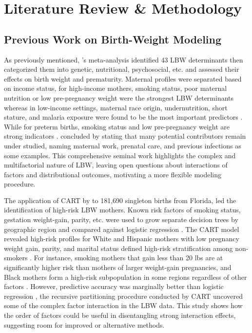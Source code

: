 \chapter{Literature Review \& Methodology}
\label{chap:chapter2-title}

\section{Previous Work on Birth-Weight Modeling}
\label{sec:ch2-previous-work}

As previously mentioned, \citet{kramer1987}'s meta-analysis identified 43 LBW determinants then categorized them into genetic, nutritional, psychosocial, etc. and assessed their effects on birth weight and prematurity. Maternal profiles were separated based on income status, for high-income mothers, smoking status, poor maternal nutrition or low pre-pregnancy weight were the strongest LBW determinants whereas in low-income settings, maternal race origin, undernutrition, short stature, and malaria exposure were found to be the most important predictors \citep{kramer1987}. While for preterm births, smoking status and low pre-pregnancy weight are strong indicators \citep{kramer1987}.  \citet{kramer1987} concluded by stating that many potential contributors remain under studied, naming maternal work, prenatal care, and previous infections as some examples. This comprehensive seminal work highlights the complex and multifactorial nature of LBW, leaving open questions about interactions of factors and distributional outcomes, motivating a more flexible modeling procedure.

The application of CART by \citet{KITSANTAS2006275} to 181,690 singleton births from Florida, led the identification of high-risk LBW mothers. Known risk factors of smoking status, gestation weight-gain, parity, etc. were used to grow separate decision trees by geographic region and compared against logistic regression \citep{KITSANTAS2006275}. The CART model revealed high-risk profiles for White and Hispanic mothers with low pregnancy weight gain, parity, and marital status defined high-risk stratification among non-smokers \citep{KITSANTAS2006275}. For instance, smoking mothers that gain less than 20 lbs are at significantly higher risk than mothers of larger weight-gain pregnancies, and Black mothers form a high-risk subpopulation in some regions regardless of other factors \citep{KITSANTAS2006275}. However, predictive accuracy was marginally better than logistic regression \citep{KITSANTAS2006275}, the recursive partitioning procedure conducted by CART uncovered some of the complex factor interaction in the LBW data. This study shows how the order of factors could be useful in disentangling strong interaction effects, suggesting room for improved or alternative methods. 

